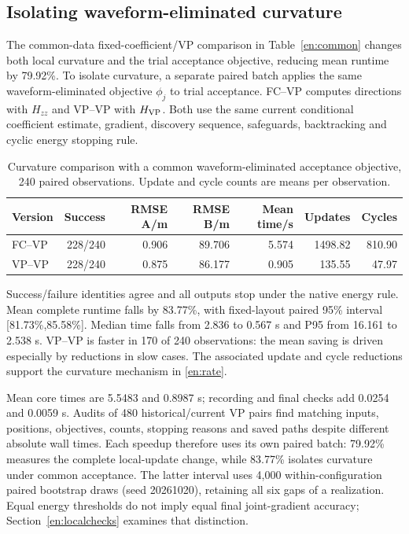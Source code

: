 \documentclass[a4paper,fleqn,review]{cas-sc}
\begin{document}
\subsection{Isolating waveform-eliminated curvature}
The common-data fixed-coefficient/VP comparison in Table~\ref{en:common} changes both local curvature and the trial acceptance objective, reducing mean runtime by 79.92\%. To isolate curvature, a separate paired batch applies the same waveform-eliminated objective $\phi_j$ to trial acceptance. FC--VP computes directions with $H_{zz}$ and VP--VP with $H_{\rm VP}$. Both use the same current conditional coefficient estimate, gradient, discovery sequence, safeguards, backtracking and cyclic energy stopping rule.
\begin{table}[pos=H]\centering\small
\caption{Curvature comparison with a common waveform-eliminated acceptance objective, 240 paired observations. Update and cycle counts are means per observation.}\label{en:curvaturetable}
\begin{tabular}{@{}lrrrrrr@{}}\toprule
Version & Success & RMSE A/m & RMSE B/m & Mean time/s & Updates & Cycles\\\midrule
FC--VP & 228/240 & 0.906 & 89.706 & 5.574 & 1498.82 & 810.90\\
VP--VP & 228/240 & 0.875 & 86.177 & 0.905 & 135.55 & 47.97\\\bottomrule
\end{tabular}\end{table}
Success/failure identities agree and all outputs stop under the native energy rule. Mean complete runtime falls by 83.77\%, with fixed-layout paired 95\% interval [81.73\%,85.58\%]. Median time falls from 2.836 to 0.567 s and P95 from 16.161 to 2.538 s. VP--VP is faster in 170 of 240 observations: the mean saving is driven especially by reductions in slow cases. The associated update and cycle reductions support the curvature mechanism in \eqref{en:rate}.

Mean core times are 5.5483 and 0.8987 s; recording and final checks add 0.0254 and 0.0059 s. Audits of 480 historical/current VP pairs find matching inputs, positions, objectives, counts, stopping reasons and saved paths despite different absolute wall times. Each speedup therefore uses its own paired batch: 79.92\% measures the complete local-update change, while 83.77\% isolates curvature under common acceptance. The latter interval uses 4,000 within-configuration paired bootstrap draws (seed 20261020), retaining all six gaps of a realization. Equal energy thresholds do not imply equal final joint-gradient accuracy; Section~\ref{en:localchecks} examines that distinction.
\end{document}

